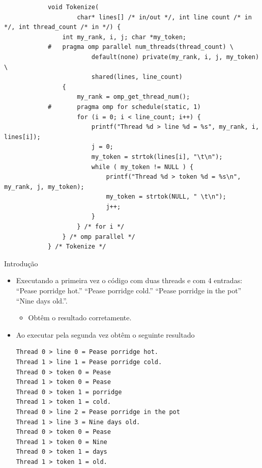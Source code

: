 	\begin{frame}[fragile]
		\begin{verbatim}
			void Tokenize(
					char* lines[] /* in/out */, int line count /* in */, int thread_count /* in */) {
				int my_rank, i, j; char *my_token;
			#	pragma omp parallel num_threads(thread_count) \ 
						default(none) private(my_rank, i, j, my_token) \ 
						shared(lines, line_count)
				{
					my_rank = omp_get_thread_num(); 
			#		pragma omp for schedule(static, 1) 
					for (i = 0; i < line_count; i++) {
						printf("Thread %d > line %d = %s", my_rank, i, lines[i]);
						j = 0;
						my_token = strtok(lines[i], "\t\n");
						while ( my_token != NULL ) {
							printf("Thread %d > token %d = %s\n", my_rank, j, my_token);
							my_token = strtok(NULL, " \t\n");
							j++;
						}
					} /* for i */
				} /* omp parallel */
			} /* Tokenize */
		\end{verbatim}
\end{frame}

	\begin{frame}[fragile]{Introdução}
		\begin{itemize}
			\item Executando a primeira vez o código com duas threads e com 4 entradas: ``Pease porridge hot.'' ``Pease porridge cold.'' ``Pease porridge in the pot'' ``Nine days old.''.
			\begin{itemize}
				\item Obtêm o resultado corretamente.
			\end{itemize}

			\item Ao executar pela segunda vez obtêm o seguinte resultado
			\begin{verbatim}
Thread 0 > line 0 = Pease porridge hot.
Thread 1 > line 1 = Pease porridge cold.
Thread 0 > token 0 = Pease
Thread 1 > token 0 = Pease
Thread 0 > token 1 = porridge
Thread 1 > token 1 = cold.
Thread 0 > line 2 = Pease porridge in the pot 
Thread 1 > line 3 = Nine days old.
Thread 0 > token 0 = Pease 
Thread 1 > token 0 = Nine 
Thread 0 > token 1 = days 
Thread 1 > token 1 = old.
			\end{verbatim}
		\end{itemize}
\end{frame}


